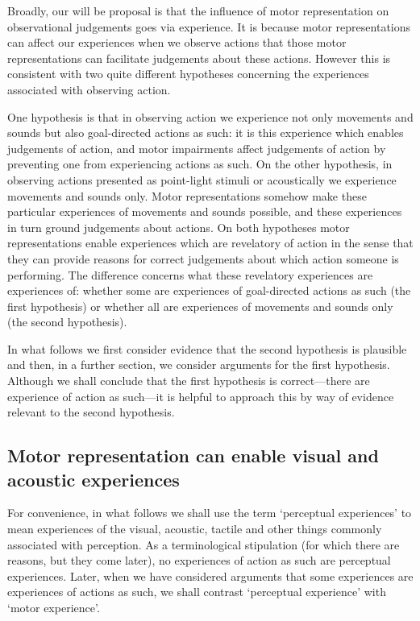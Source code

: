 \documentclass[12pt,\papersize]{extarticle}
\begin{document}
Broadly, our will be proposal is that the influence of motor representation on observational judgements goes via experience.  It is because motor representations can affect our experiences when we observe actions that those motor representations can facilitate judgements about these actions.  However this is consistent with two quite different hypotheses concerning the experiences associated with observing action.

One hypothesis is that in observing action we experience not only movements and sounds but also goal-directed actions as such: it is this experience which enables judgements of action, and motor impairments affect judgements of action by preventing one from experiencing actions as such. On the other hypothesis, in observing actions presented as point-light stimuli or acoustically we experience movements and sounds only. Motor representations somehow make these particular experiences of movements and sounds possible, and these experiences in turn ground judgements about actions.  On both hypotheses motor representations enable experiences which are revelatory of action in the sense that they can provide reasons for correct judgements about which action someone is performing.  The difference concerns what these revelatory experiences are experiences of: whether some are experiences of goal-directed actions as such (the first hypothesis) or whether all are experiences of movements and sounds only (the second hypothesis).  


In what follows we first consider evidence that the second hypothesis is plausible and then, in a further section, we consider arguments for the first hypothesis.  Although we shall conclude that the first hypothesis is correct---there are experience of action as such---it is helpful to approach this by way of evidence relevant to the second hypothesis.


\subsection{Motor representation can enable visual and acoustic experiences}
For convenience, in what follows we shall use the term `perceptual experiences' to mean experiences of the visual, acoustic, tactile and other things commonly associated with perception.  As a terminological stipulation (for which there are reasons, but they come later), no experiences of action as such are perceptual experiences.  Later, when we have considered arguments that some experiences are experiences of actions as such, we shall contrast `perceptual experience' with `motor experience'.
\end{document}
